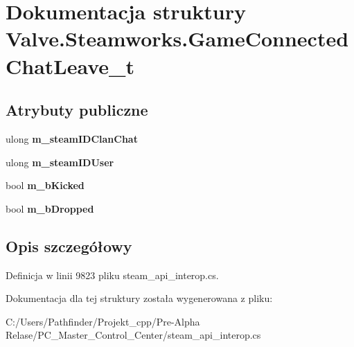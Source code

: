\hypertarget{struct_valve_1_1_steamworks_1_1_game_connected_chat_leave__t}{}\section{Dokumentacja struktury Valve.\+Steamworks.\+Game\+Connected\+Chat\+Leave\+\_\+t}
\label{struct_valve_1_1_steamworks_1_1_game_connected_chat_leave__t}
\subsection*{Atrybuty publiczne}
\begin{DoxyCompactItemize}
\item 
\mbox{\label{struct_valve_1_1_steamworks_1_1_game_connected_chat_leave__t_a5185a4c0e684d783fbf8358ff4be3898}} 
ulong {\bfseries m\+\_\+steam\+I\+D\+Clan\+Chat}
\item 
\mbox{\label{struct_valve_1_1_steamworks_1_1_game_connected_chat_leave__t_a9fdb17b2af91745605a8801c1707f2da}} 
ulong {\bfseries m\+\_\+steam\+I\+D\+User}
\item 
\mbox{\label{struct_valve_1_1_steamworks_1_1_game_connected_chat_leave__t_aeb3063088b28c90d45cc6eeb5271ba0b}} 
bool {\bfseries m\+\_\+b\+Kicked}
\item 
\mbox{\label{struct_valve_1_1_steamworks_1_1_game_connected_chat_leave__t_a5d2a8d66712d6f3ebf1e89bd4052f973}} 
bool {\bfseries m\+\_\+b\+Dropped}
\end{DoxyCompactItemize}


\subsection{Opis szczegółowy}


Definicja w linii 9823 pliku steam\+\_\+api\+\_\+interop.\+cs.



Dokumentacja dla tej struktury została wygenerowana z pliku\+:\begin{DoxyCompactItemize}
\item 
C\+:/\+Users/\+Pathfinder/\+Projekt\+\_\+cpp/\+Pre-\/\+Alpha Relase/\+P\+C\+\_\+\+Master\+\_\+\+Control\+\_\+\+Center/steam\+\_\+api\+\_\+interop.\+cs\end{DoxyCompactItemize}
